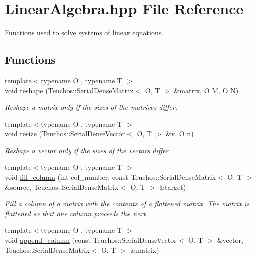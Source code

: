 \section{Linear\+Algebra.\+hpp File Reference}
\label{LinearAlgebra_8hpp}


Functions used to solve systems of linear equations.  


\subsection*{Functions}
\begin{DoxyCompactItemize}
\item 
{\footnotesize template$<$typename O , typename T $>$ }\\void \hyperlink{LinearAlgebra_8hpp_a48af7232f36a15e07025e5f1976bacea}{reshape} (Teuchos\+::\+Serial\+Dense\+Matrix$<$ O, T $>$ \&matrix, O M, O N)\label{LinearAlgebra_8hpp_a48af7232f36a15e07025e5f1976bacea}

\begin{DoxyCompactList}\small\item\em Reshape a matrix only if the sizes of the matrices differ. \end{DoxyCompactList}\item 
{\footnotesize template$<$typename O , typename T $>$ }\\void \hyperlink{LinearAlgebra_8hpp_ac86ad98f9b3565d1376c2c064c44da88}{resize} (Teuchos\+::\+Serial\+Dense\+Vector$<$ O, T $>$ \&v, O n)\label{LinearAlgebra_8hpp_ac86ad98f9b3565d1376c2c064c44da88}

\begin{DoxyCompactList}\small\item\em Reshape a vector only if the sizes of the vectors differ. \end{DoxyCompactList}\item 
{\footnotesize template$<$typename O , typename T $>$ }\\void \hyperlink{LinearAlgebra_8hpp_ab2548ff0bd8452b3e67342f215c84743}{fill\+\_\+column} (int col\+\_\+number, const Teuchos\+::\+Serial\+Dense\+Matrix$<$ O, T $>$ \&source, Teuchos\+::\+Serial\+Dense\+Matrix$<$ O, T $>$ \&target)\label{LinearAlgebra_8hpp_ab2548ff0bd8452b3e67342f215c84743}

\begin{DoxyCompactList}\small\item\em Fill a column of a matrix with the contents of a flattened matrix. The matrix is flattened so that one column proceeds the next. \end{DoxyCompactList}\item 
{\footnotesize template$<$typename O , typename T $>$ }\\void \hyperlink{LinearAlgebra_8hpp_afb56325d86dc318a43c573e30c8e213b}{append\+\_\+column} (const Teuchos\+::\+Serial\+Dense\+Vector$<$ O, T $>$ \&vector, Teuchos\+::\+Serial\+Dense\+Matrix$<$ O, T $>$ \&matrix)\label{LinearAlgebra_8hpp_afb56325d86dc318a43c573e30c8e213b}


\end{DoxyCompactItemize}
